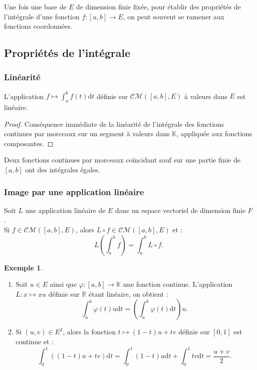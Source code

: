 \documentclass[french]{article}
\newcommand{\R}{\mathbb{R}}
\newcommand{\K}{\mathbb{K}}
\renewcommand{\d}{\text{d}}
\theoremstyle{plain}
\theoremstyle{definition}
\newtheorem*{ex}{Exemple}
\theoremstyle{remark}
\begin{document}
\begin{met}
	Une fois une base de $E$ de dimension finie fixée, pour établir des propriétés de l'intégrale d'une fonction $f:[a,b]\to E$, on peut souvent se ramener aux fonctions coordonnées.
\end{met}

\subsection{Propriétés de l'intégrale}

\subsubsection*{Linéarité}

\begin{prop}%
	L'application $f\mapsto\displaystyle\int_{a}^{b}f(t)\d t$ définie sur $\mathcal{CM}([a,b],E)$ à valeurs dans $E$ est linéaire.
\end{prop}
\begin{proof}
	Conséquence immédiate de la linéarité de l'intégrale des fonctions continues par morceaux sur un segment à valeurs dans $\K$, appliquée aux fonctions composantes.
\end{proof}

\begin{cor}%
	Deux fonctions continues par morceaux coïncidant sauf sur une partie finie de $[a,b]$ ont des intégrales égales.
\end{cor}

\subsubsection*{Image par une application linéaire}

\begin{prop}%
	Soit $L$ une application linéaire de $E$ dans un espace vectoriel de dimension finie $F$. \\
	Si $f\in\mathcal{CM}([a,b],E)$, alors $L\circ f\in\mathcal{CM}([a,b],E)$ et :
	$$L\left(\int_{a}^{b}f\right)=\int_{a}^{b}L\circ f.$$
\end{prop}

\begin{ex}
	\begin{enumerate}
		\item Soit $u\in E$ ainsi que $\varphi:[a,b]\to\K$ une fonction continue. L'application $L:x\mapsto xu$ définie sur $\R$ étant linéaire, on obtient :
		$$\int_{a}^{b}\varphi(t)u\d t=\left(\int_{a}^{b}\varphi(t)\d t\right)u.$$
		\item Si $(u,v)\in E^2$, alors la fonction $t\mapsto (1-t)u+tv$ définie sur $[0,1]$ est continue et :
		$$\int_{0}^{1}((1-t)u+tv)\d t=\int_{0}^{1}(1-t)u\d t+\int_{0}^{1}tv\d t=\frac{u+v}{2}.$$
	\end{enumerate}
\end{ex}
\end{document}
